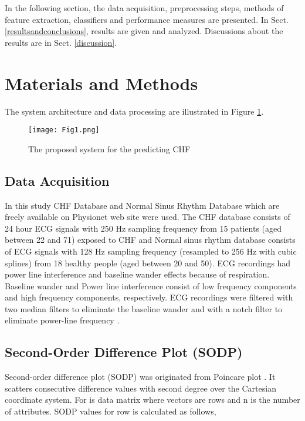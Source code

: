 \documentclass[twocolumn]{svjour3}
\begin{document}
In the following section, the data acquisition, preprocessing steps, methods of feature extraction, classifiers and performance measures are presented. In Sect. \ref{resultsandconclusions}, results are given and analyzed. Discussions about the results are in Sect. \ref{discussion}.

\section{Materials and Methods} 
\label{sec:Materials and Methods}
The system architecture and data processing are illustrated in Figure \ref{figure1}.

\begin{figure}
    \centering
    \texttt{[image: Fig1.png]}
    \caption{The proposed system for the predicting CHF}
    \label{figure1}
\end{figure}

\subsection{Data Acquisition}
In this study CHF Database and Normal Sinus Rhythm Database which are freely available on Physionet web site \cite{ref20} were used.  The CHF database consists of 24 hour ECG signals with 250 Hz sampling  frequency from 15 patients (aged between 22 and 71) exposed to CHF and  Normal sinus rhythm database consists of ECG signals with 128 Hz sampling frequency (resampled to 256 Hz with cubic splines) from 18 healthy people (aged between 20 and 50). ECG recordings had power line interference and baseline wander effects because of respiration. Baseline wander and Power line interference consist of low frequency components and high frequency components, respectively. ECG recordings were filtered with two median filters to eliminate the baseline wander and with a notch filter to eliminate power-line frequency \cite{ref21}. 

\subsection{Second-Order Difference Plot (SODP)}
Second-order difference plot (SODP) was originated from Poincare plot \cite{ref8}. It scatters consecutive difference values with second degree over the Cartesian coordinate system. For  is data matrix where  vectors are rows and n is the number of attributes. SODP values for  row is calculated as follows,
\end{document}
